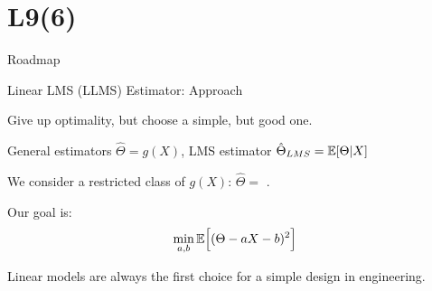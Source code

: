 \section{L9(6)}
\begin{frame}{Roadmap}

\plitemsep 0.15in

\bce[(1)]

\item {}

\item {}

\item {}

\item {}

\item {}

\item {}



  
  \ece

\end{frame}

\begin{frame}{Linear LMS (LLMS) Estimator: Approach}

\plitemsep 0.15in
\bci

\item<2-> Give up optimality, but choose a simple, but good one.

\item<3-> General estimators $\hat{\Theta} = g(X)$, LMS estimator $\hat{\Theta}_{LMS} = \mathbb{E}[ \Theta | X ]$

\item<4-> We consider a restricted class of $g(X)$: $\hat{\Theta} =$ .

\item<6-> Our goal is:
$$
\min_{a,b} \mathbb{E}\Bigl[ (\Theta - aX -b)^2 \Bigr]
$$

\item<7-> Linear models are always the first choice for a simple design in engineering.

\eci


\end{frame}


